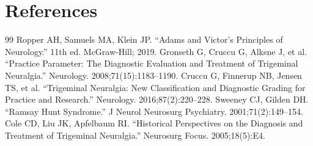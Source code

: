 \section*{References}
\begin{thebibliography}{99}
 Ropper AH, Samuels MA, Klein JP. ``Adams and Victor's Principles of Neurology.'' 11th ed. McGraw-Hill; 2019.
 Gronseth G, Cruccu G, Alksne J, et al. ``Practice Parameter: The Diagnostic Evaluation and Treatment of Trigeminal Neuralgia.'' Neurology. 2008;71(15):1183--1190.
 Cruccu G, Finnerup NB, Jensen TS, et al. ``Trigeminal Neuralgia: New Classification and Diagnostic Grading for Practice and Research.'' Neurology. 2016;87(2):220--228.
 Sweeney CJ, Gilden DH. ``Ramsay Hunt Syndrome.'' J Neurol Neurosurg Psychiatry. 2001;71(2):149--154.
 Cole CD, Liu JK, Apfelbaum RI. ``Historical Perspectives on the Diagnosis and Treatment of Trigeminal Neuralgia.'' Neurosurg Focus. 2005;18(5):E4.
\end{thebibliography}
